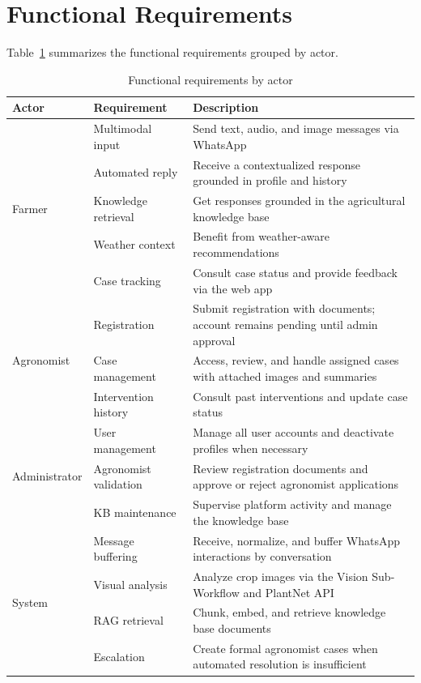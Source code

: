 \section{Functional Requirements}

Table~\ref{tab:functional-req} summarizes the functional requirements grouped by actor.

\begin{table}[H]
\centering
\caption{Functional requirements by actor}
\label{tab:functional-req}
\begin{tabular}{p{2.5cm} p{3.5cm} p{7cm}}
\toprule
\textbf{Actor} & \textbf{Requirement} & \textbf{Description} \\
\midrule
\multirow{5}{*}{Farmer}
  & Multimodal input      & Send text, audio, and image messages via WhatsApp \cite{zhu2025vlm,yin2025foundation} \\
  & Automated reply       & Receive a contextualized response grounded in profile and history \cite{li2025llm} \\
  & Knowledge retrieval   & Get responses grounded in the agricultural knowledge base \cite{li2025llm,pgvector2024} \\
  & Weather context       & Benefit from weather-aware recommendations \cite{worldbank2024irrigation} \\
  & Case tracking         & Consult case status and provide feedback via the web app \cite{li2025llm} \\
\midrule
\multirow{3}{*}{Agronomist}
  & Registration          & Submit registration with documents; account remains pending until admin approval \\
  & Case management       & Access, review, and handle assigned cases with attached images and summaries \cite{li2025llm,yin2025foundation} \\
  & Intervention history  & Consult past interventions and update case status \\
\midrule
\multirow{3}{*}{Administrator}
  & User management       & Manage all user accounts and deactivate profiles when necessary \cite{li2025llm} \\
  & Agronomist validation & Review registration documents and approve or reject agronomist applications \\
  & KB maintenance        & Supervise platform activity and manage the knowledge base \\
\midrule
\multirow{4}{*}{System}
  & Message buffering     & Receive, normalize, and buffer WhatsApp interactions by conversation \\
  & Visual analysis       & Analyze crop images via the Vision Sub-Workflow and PlantNet API \\
  & RAG retrieval         & Chunk, embed, and retrieve knowledge base documents \cite{li2025llm,pgvector2024} \\
  & Escalation            & Create formal agronomist cases when automated resolution is insufficient \cite{li2025llm,yin2025foundation} \\
\bottomrule
\end{tabular}
\end{table}

